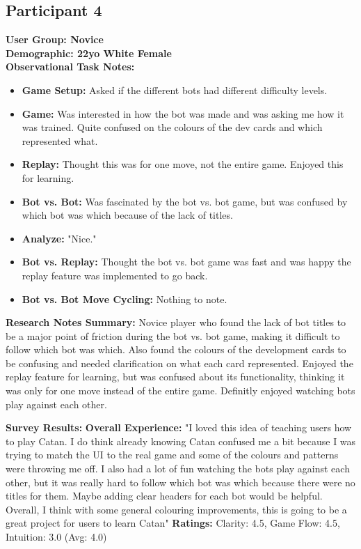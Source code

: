 \documentclass[12pt]{article}
\begin{document}
\subsection{Participant 4}
\textbf {User Group: Novice} \\
\textbf {Demographic: 22yo White Female} \\
\textbf{Observational Task Notes:}
\begin{itemize}
    \item \textbf{Game Setup:} Asked if the different bots had different difficulty levels.
    \item \textbf{Game:} Was interested in how the bot was made and was asking me how it was trained. Quite confused on the colours of the dev cards and which represented what.
    \item \textbf{Replay:} Thought this was for one move, not the entire game. Enjoyed this for learning.
    \item \textbf{Bot vs. Bot:} Was fascinated by the bot vs. bot game, but was confused by which bot was which because of the lack of titles.
    \item \textbf{Analyze:} "Nice."
    \item \textbf{Bot vs. Replay:} Thought the bot vs. bot game was fast and was happy the replay feature was implemented to go back.
    \item \textbf{Bot vs. Bot Move Cycling:} Nothing to note.
\end{itemize}
\textbf{Research Notes Summary:} Novice player who found the lack of bot titles to be a major point of friction during the bot vs. bot game, making it difficult to follow which bot was which. Also found the colours of the development cards to be confusing and needed clarification on what each card represented. Enjoyed the replay feature for learning, but was confused about its functionality, thinking it was only for one move instead of the entire game. Definitly enjoyed watching bots play against each other.

\textbf{Survey Results:}
\subitem \textbf{Overall Experience:} "I loved this idea of teaching users how to play Catan. I do think already knowing Catan confused me a bit because I was trying to match the UI to the real game and some of the colours and patterns were throwing me off. I also had a lot of fun watching the bots play against each other, but it was really hard to follow which bot was which because there were no titles for them. Maybe adding clear headers for each bot would be helpful. Overall, I think with some general colouring improvements, this is going to be a great project for users to learn Catan"
\subitem \textbf{Ratings:} Clarity: 4.5, Game Flow: 4.5, Intuition: 3.0 (Avg: 4.0)
\end{document}
